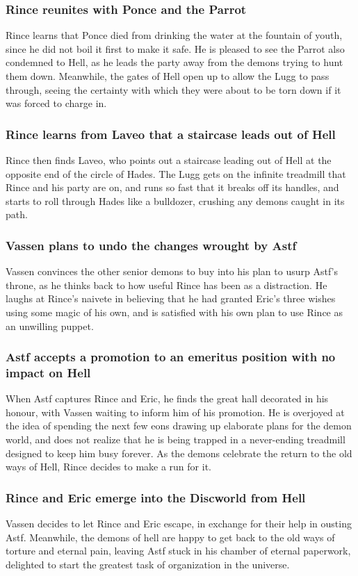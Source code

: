 \subsubsection{\Gls{Rince} reunites with \Gls{Ponce} and the \Gls{Parrot}}
\Gls{Rince} learns that \Gls{Ponce} died from drinking the water at the fountain of youth, since he
did not boil it first to make it safe. He is pleased to see the \Gls{Parrot} also condemned to Hell,
as he leads the party away from the demons trying to hunt them down. Meanwhile, the gates of Hell
open up to allow the \Gls{Lugg} to pass through, seeing the certainty with which they were about to
be torn down if it was forced to charge in.

\subsubsection{\Gls{Rince} learns from \Gls{Laveo} that a staircase leads out of Hell}
\Gls{Rince} then finds \Gls{Laveo}, who points out a staircase leading out of Hell at the opposite
end of the circle of Hades. The \Gls{Lugg} gets on the infinite treadmill that \Gls{Rince} and his
party are on, and runs so fast that it breaks off its handles, and starts to roll through Hades
like a bulldozer, crushing any demons caught in its path.

\subsubsection{\Gls{Vassen} plans to undo the changes wrought by \Gls{Astf}}
\Gls{Vassen} convinces the other senior demons to buy into his plan to usurp \Gls{Astf}'s throne,
as he thinks back to how useful \Gls{Rince} has been as a distraction. He laughs at \Gls{Rince}'s
naivete in believing that he had granted \Gls{Eric}'s three wishes using some magic of his own, and
is satisfied with his own plan to use \Gls{Rince} as an unwilling puppet.

\subsubsection{\Gls{Astf} accepts a promotion to an emeritus position with no impact on Hell}
When \Gls{Astf} captures \Gls{Rince} and \Gls{Eric}, he finds the great hall decorated in his
honour, with \Gls{Vassen} waiting to inform him of his promotion. He is overjoyed at the idea of
spending the next few eons drawing up elaborate plans for the demon world, and does not realize that
he is being trapped in a never-ending treadmill designed to keep him busy forever. As the demons
celebrate the return to the old ways of Hell, \Gls{Rince} decides to make a run for it.

\subsubsection{\Gls{Rince} and \Gls{Eric} emerge into the Discworld from Hell}
\Gls{Vassen} decides to let \Gls{Rince} and \Gls{Eric} escape, in exchange for their help in
ousting \Gls{Astf}. Meanwhile, the demons of hell are happy to get back to the old ways of torture
and eternal pain, leaving \Gls{Astf} stuck in his chamber of eternal paperwork, delighted to start
the greatest task of organization in the universe.